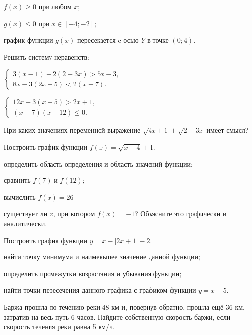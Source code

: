 \begin{class}[number=1]
\begin{listofex}
\begin{enumcols}[itemcolumns=1, resume]
			\item \( f(x)\ge0 \) при любом \( x \);
			\item \( g(x)\le0 \) при \( x\in[-4;-2] \);
			\item график функции \( g(x) \) пересекается c осью \( Y \) в точке \( (0;4) \).
		\end{enumcols}
		\item Решить систему неравенств:
		\begin{enumcols}[itemcolumns=2]
			\item
			\( \left\{
			\begin{array}{l}
				3(x-1)-2(2-3x)>5x-3,\\
				8x-3(2x+5)<2(x-7).
			\end{array}
			\right. \)
			\item
			\( \left\{
			\begin{array}{l}
				12x-3(x-5)>2x+1,\\
				(x-7)(x+12)\le0.
			\end{array}
			\right. \)
		\end{enumcols}
		\item При каких значениях переменной выражение \( \sqrt{4x+1}+\sqrt{2-3x} \) имеет смысл?
		\item Построить график функции \( f(x)=\sqrt{x-4}+1 \).
		\begin{enumcols}[itemcolumns=1]
			\item определить область определения и область значений функции;
			\item сравнить \( f(7) \) и \( f(12) \);
			\item вычислить \( f(x)=26 \)
			\item существует ли \( x \), при котором \( f(x)=-1 \)? Объясните это графически и аналитически.
		\end{enumcols}
		\item Построить график функции \( y=x-|2x+1|-2 \).
		\begin{enumcols}[itemcolumns=1]
			\item найти точку минимума и наименьшее значение данной функции;
			\item определить промежутки возрастания и убывания функции;
			\item найти точки пересечения данного графика с графиком функции \( y=x-5 \).
		\end{enumcols}
		\item Баржа прошла по течению реки 48 км и, повернув обратно, прошла ещё 36 км, затратив на весь путь 6 часов. Найдите собственную скорость баржи, если скорость течения реки равна 5 км/ч.
	\end{listofex}
\end{class}

